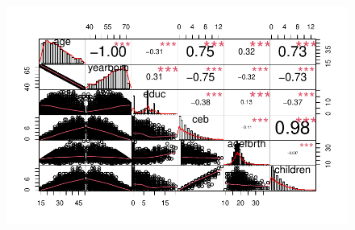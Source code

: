 \documentclass[
  letterpaper,
  DIV=11,
  numbers=noendperiod]{scrartcl}
\begin{document}
\begin{figure}[H]

{\centering \includegraphics{Fertility_Rates_Education_Impact_Botswana_files/figure-pdf/unnamed-chunk-37-1.pdf}

}

\end{figure}
\end{document}
